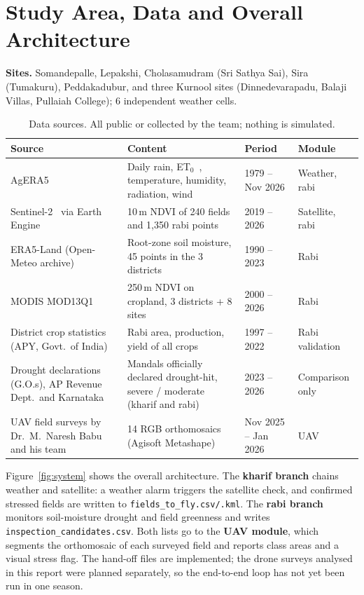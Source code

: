 \documentclass[11pt,a4paper,oneside]{article}
\begin{document}
\section{Study Area, Data and Overall Architecture}
\textbf{Sites.} Somandepalle, Lepakshi, Cholasamudram (Sri Sathya Sai), Sira (Tumakuru), Peddakadubur, and three Kurnool sites (Dinnedevarapadu, Balaji Villas, Pullaiah College); 6 independent weather cells.

\begin{table}[!htbp]
\centering
\caption{Data sources. All public or collected by the team; nothing is simulated.}
\label{tab:data}
\scriptsize
\begin{tabularx}{\textwidth}{@{}p{4.1cm}Yp{2.4cm}p{2.3cm}@{}}
\toprule
\textbf{Source} & \textbf{Content} & \textbf{Period} & \textbf{Module} \\
\midrule
AgERA5~\cite{agera5} & Daily rain, ET$_0$~\cite{allen1998}, temperature, humidity, radiation, wind & 1979 -- Nov 2026 & Weather, rabi \\
Sentinel-2~\cite{drusch2012} via Earth Engine~\cite{gorelick2017} & 10\,m NDVI of 240 fields and 1,350 rabi points & 2019 -- 2026 & Satellite, rabi \\
ERA5-Land (Open-Meteo archive) & Root-zone soil moisture, 45 points in the 3 districts & 1990 -- 2023 & Rabi \\
MODIS MOD13Q1 & 250\,m NDVI on cropland, 3 districts + 8 sites & 2000 -- 2026 & Rabi \\
District crop statistics (APY, Govt.\ of India) & Rabi area, production, yield of all crops & 1997 -- 2022 & Rabi validation \\
Drought declarations (G.O.s), AP Revenue Dept.\ and Karnataka & Mandals officially declared drought-hit, severe / moderate (kharif and rabi) & 2023 -- 2026 & Comparison only \\
UAV field surveys by Dr.\ M.\ Naresh Babu and his team & 14 RGB orthomosaics (Agisoft Metashape) & Nov 2025 -- Jan 2026 & UAV \\
\bottomrule
\end{tabularx}
\end{table}

Figure~\ref{fig:system} shows the overall architecture. The \textbf{kharif branch} chains weather and satellite: a weather alarm triggers the satellite check, and confirmed stressed fields are written to \texttt{fields\_to\_fly.csv/.kml}. The \textbf{rabi branch} monitors soil-moisture drought and field greenness and writes \texttt{inspection\_candidates.csv}. Both lists go to the \textbf{UAV module}, which segments the orthomosaic of each surveyed field and reports class areas and a visual stress flag. The hand-off files are implemented; the drone surveys analysed in this report were planned separately, so the end-to-end loop has not yet been run in one season.
\end{document}
